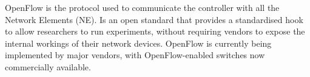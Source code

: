 OpenFlow is the protocol used to communicate the controller with all the Network Elements (NE). Is an open standard that provides a standardised hook to allow researchers to run experiments, without requiring vendors to expose the internal workings of their network devices. OpenFlow is currently being implemented by major vendors, with OpenFlow-enabled switches now commercially available.









